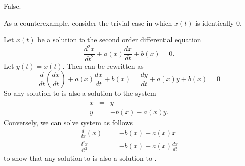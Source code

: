  \ans False.

\soln As a counterexample, consider the trivial case in which $x(t)$
is identically $0$.

Let $x(t)$ be a solution to the second order differential equation
\begin{equation} \label{order2}
\frac{d^2x}{dt^2} + a(x)\frac{dx}{dt} + b(x) = 0.
\end{equation}
Let $y(t) = \dot x(t)$.  Then  can be rewritten as
\[ \frac{d}{dt}\left(\frac{dx}{dt}\right) + a(x)\frac{dx}{dt}
+ b(x) = \frac{dy}{dt} + a(x)y + b(x) = 0 \]
So any solution to  is also a solution to the system
\begin{equation} \label{order2sol}
\begin{array}{rcl}
\dot{x} & = & y \\
\dot{y} & = & -b(x) - a(x) y.\end{array}
\end{equation}
Conversely, we can solve system  as follows
\[ \begin{array}{rcl}
\frac{d}{dx}\left(\dot{x}\right) & = & -b(x) - a(x)\dot{x} \\
\frac{d^2x}{dt^2} & = & -b(x) - a(x)\frac{dx}{dt}\end{array}
\]
to show that any solution to  is also a solution
to .






















